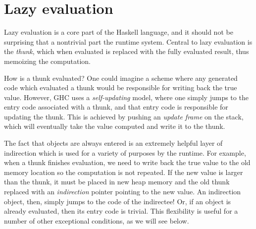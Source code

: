 \section{Lazy evaluation}

Lazy evaluation is a core part of the Haskell language, and
it should not be surprising that a nontrivial part the runtime
system.  Central to lazy evaluation is the \emph{thunk}, which
when evaluated is replaced with the fully evaluated result,
thus memoizing the computation.





How is a thunk evaluated?  One could imagine a scheme where any
generated code which evaluated a thunk would be responsible for writing
back the true value.  However, GHC uses a \emph{self-updating} model,
where one simply jumps to the entry code associated with a thunk, and that
entry code is responsible for updating the thunk.  This is achieved by
pushing an \emph{update frame} on the stack, which will eventually
take the value computed and write it to the thunk.

The fact that objects are always entered is an extremely helpful layer
of indirection which is used for a variety of purposes by the runtime.
For example, when a thunk finishes evaluation, we need to write back the
true value to the old memory location so the computation is not
repeated.  If the new value is larger than the thunk, it must be placed
in new heap memory and the old thunk replaced with an \emph{indirection}
pointer pointing to the new value.  An indirection object, then, simply
jumps to the code of the indirectee!  Or, if an object is already evaluated,
then its entry code is trivial.  This flexibility is useful for a
number of other exceptional conditions, as we will see below.

